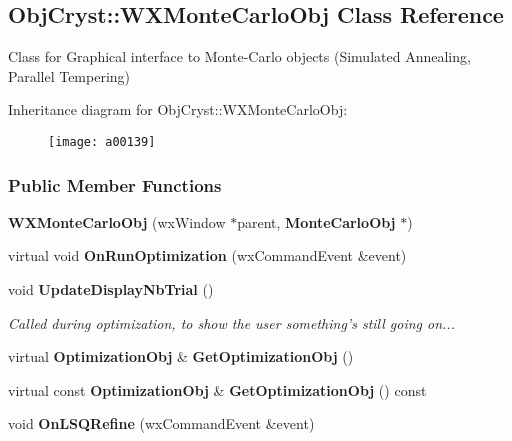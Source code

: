 \subsection{Obj\+Cryst\+:\+:W\+X\+Monte\+Carlo\+Obj Class Reference}
\label{a00139}


Class for Graphical interface to Monte-\/\+Carlo objects (Simulated Annealing, Parallel Tempering)  


Inheritance diagram for Obj\+Cryst\+:\+:W\+X\+Monte\+Carlo\+Obj\+:\begin{figure}[H]
\begin{center}
\leavevmode
\texttt{[image: a00139]}
\end{center}
\end{figure}
\subsubsection*{Public Member Functions}
\begin{DoxyCompactItemize}
\item 
{\bfseries W\+X\+Monte\+Carlo\+Obj} (wx\+Window $\ast$parent, {\bf Monte\+Carlo\+Obj} $\ast$)\label{a00139_a7f065d157d74531110e16c7d8081a95c}

\item 
virtual void {\bfseries On\+Run\+Optimization} (wx\+Command\+Event \&event)\label{a00139_a098a0d500afd4106725f308b4a5938a5}

\item 
void {\bf Update\+Display\+Nb\+Trial} ()\label{a00139_acbceaa3d0ad0a5936d79a4322eca4df3}

\begin{DoxyCompactList}\small\item\em Called during optimization, to show the user something's still going on... \end{DoxyCompactList}\item 
virtual {\bf Optimization\+Obj} \& {\bfseries Get\+Optimization\+Obj} ()\label{a00139_a82f53dc7990c736211df87a47c0104eb}

\item 
virtual const {\bf Optimization\+Obj} \& {\bfseries Get\+Optimization\+Obj} () const \label{a00139_a9d58c53f79b831360d3dc09eb8da5213}

\item 
void {\bfseries On\+L\+S\+Q\+Refine} (wx\+Command\+Event \&event)\label{a00139_aa7c362490aa3761ae1426f2fe111d622}

\end{DoxyCompactItemize}
